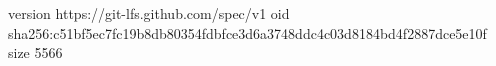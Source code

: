 version https://git-lfs.github.com/spec/v1
oid sha256:c51bf5ec7fc19b8db80354fdbfce3d6a3748ddc4c03d8184bd4f2887dce5e10f
size 5566
